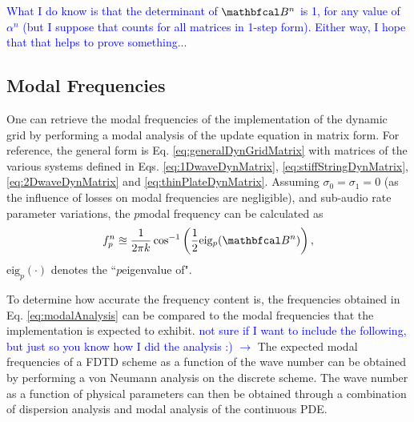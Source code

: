 \documentclass[fleqn]{jaes}
\def\SWcomment[#1]{\textcolor{blue}{#1}}
\begin{document}
\SWcomment[
What I do know is that the determinant of $\BB$ is 1, for any value of $\alpha^n$ (but I suppose that counts for all matrices in 1-step form). Either way, I hope that that helps to prove something...]

\subsection{Modal Frequencies}

One can retrieve the modal frequencies of the implementation of the dynamic grid by performing a modal analysis of the update equation in matrix form. For reference, the general form is Eq. \eqref{eq:generalDynGridMatrix} with matrices of the various systems defined in Eqs. \eqref{eq:1DwaveDynMatrix}, \eqref{eq:stiffStringDynMatrix}, \eqref{eq:2DwaveDynMatrix} and \eqref{eq:thinPlateDynMatrix}. Assuming $\sigma_0 = \sigma_1 = 0$ (as the influence of losses on modal frequencies are negligible), and sub-audio rate parameter variations, the $p$\th modal frequency can be calculated as
\begin{equation}\label{eq:modalAnalysis}
    f_p^n \approxeq \frac{1}{2 \pi k}\cos^{-1}\left(\frac{1}{2}\text{eig}_p(\BB)\right),
\end{equation}
$\text{eig}_p(\cdot)$ denotes the ``$p$\th eigenvalue of".

To determine how accurate the frequency content is, the frequencies obtained in Eq. \eqref{eq:modalAnalysis} can be compared to the modal frequencies that the implementation is expected to exhibit. \SWcomment[not sure if I want to include the following, but just so you know how I did the analysis :) $\rightarrow$]
The expected modal frequencies of a FDTD scheme as a function of the wave number can be obtained by performing a von Neumann analysis on the discrete scheme. The wave number as a function of physical parameters can then be obtained through a combination of dispersion analysis and modal analysis of the continuous PDE. 
\end{document}
